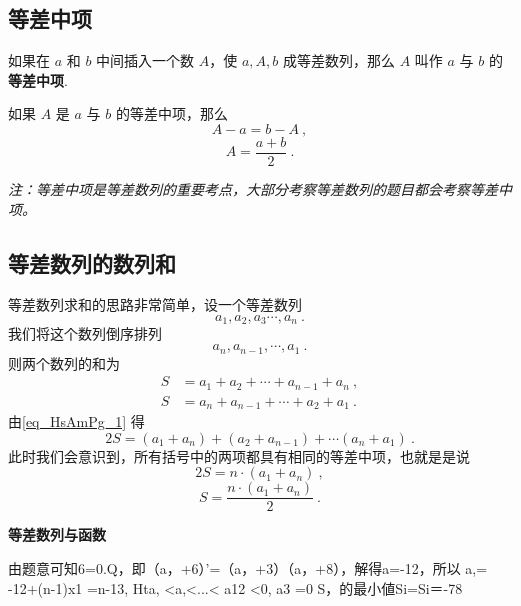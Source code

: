 \subsection{等差中项}
如果在 $a$ 和 $b$ 中间插入一个数 $A$，使 $a,A,b$ 成等差数列，那么 $A$ 叫作 $a$ 与 $b$ 的\textbf{等差中项}.

如果 $A$ 是 $a$ 与 $b$ 的等差中项，那么
\begin{equation}
A - a = b - A~,
\end{equation}
\begin{equation}
A = \frac{a+b}{2}~.
\end{equation}

\textsl{注：等差中项是等差数列的重要考点，大部分考察等差数列的题目都会考察等差中项。}

\subsection{等差数列的数列和}

等差数列求和的思路非常简单，设一个等差数列
\begin{equation}
a_1,a_2,a_3\cdots,a_n~.
\end{equation}
我们将这个数列倒序排列
\begin{equation}
a_n,a_{n-1},\cdots,a_1~.
\end{equation}
则两个数列的和为
\begin{equation}\label{eq_HsAmPg_1}
\begin{aligned}
S &= a_1 + a_2 + \cdots + a_{n-1} + a_n ~,\\
S &= a_n + a_{n - 1} + \cdots + a_2 + a_1~.
\end{aligned}
\end{equation}
由\autoref{eq_HsAmPg_1} 得
\begin{equation}
2S = (a_1+a_n) + (a_2+a_{n-1}) +\cdots (a_n + a_1)~.
\end{equation}
此时我们会意识到，所有括号中的两项都具有相同的等差中项，也就是是说
\begin{equation}
2S = n \cdot (a_1+a_n)~,
\end{equation}
\begin{equation}
S = \frac{n\cdot(a_1+a_n)}{2}~.
\end{equation}

\textbf{等差数列与函数}

由题意可知6=0.Q，即（a，+6）’=（a，+3）（a，+8），解得a=-12，所以
a,= -12+(n-1)x1 =n-13, Hta, <a,<...< a12 <0, a3 =0
S，的最小値Si=Si＝-78